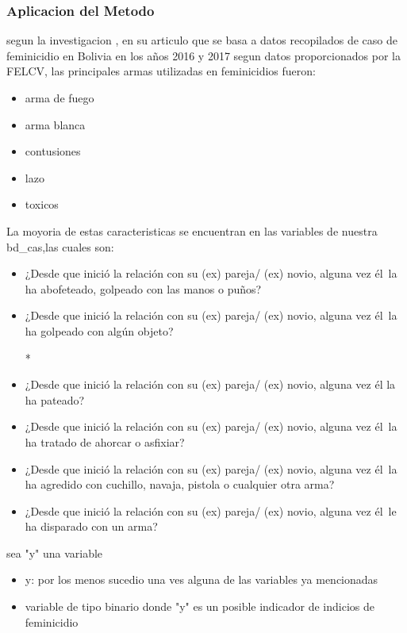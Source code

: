 \documentclass[11pt,letter]{article}
\begin{document}
\subsubsection{Aplicacion del Metodo }
segun la investigacion \autocite{cruz2019factores}, en su articulo que se basa a datos recopilados de caso de feminicidio en Bolivia en los años 2016 y 2017 segun datos proporcionados por la FELCV, las principales armas utilizadas en feminicidios fueron:
\begin{itemize}
    \item arma de fuego
\item arma blanca
\item contusiones
\item lazo 
\item toxicos 
\end{itemize}

La moyoria de estas caracteristicas se encuentran en las variables de nuestra bd_cas,las cuales son:
\begin{itemize}
    \item 	¿Desde que inició la relación con su (ex) pareja/ (ex) novio, alguna vez él la ha abofeteado, golpeado con las manos o puños?

\item	¿Desde que inició la relación con su (ex) pareja/ (ex) novio, alguna vez él la ha golpeado con algún objeto?

* \item	¿Desde que inició la relación con su (ex) pareja/ (ex) novio, alguna vez él la ha pateado?
\item	¿Desde que inició la relación con su (ex) pareja/ (ex) novio, alguna vez él la ha tratado de ahorcar o asfixiar?

\item	¿Desde que inició la relación con su (ex) pareja/ (ex) novio, alguna vez él la ha agredido con cuchillo, navaja, pistola o cualquier otra arma?

\item	¿Desde que inició la relación con su (ex) pareja/ (ex) novio, alguna vez él le ha disparado con un arma?
 
\end{itemize}

sea "y" una variable
\begin{itemize}
    \item y: por los menos sucedio una ves alguna de las variables ya mencionadas
    \item variable de tipo binario
donde "y" es un posible indicador de indicios de feminicidio

\end{itemize}
\end{document}

